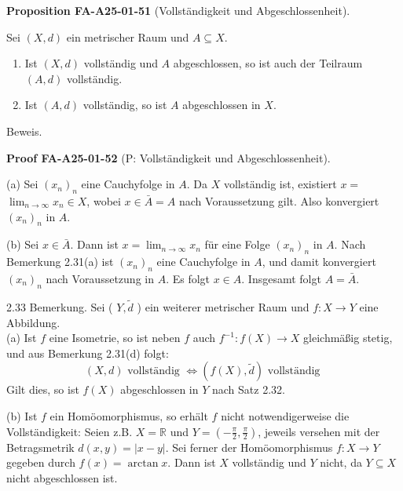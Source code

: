 \documentclass[10pt, letterpaper]{article}
\newcommand{\CustomHeading}[3]{%
  \par\medskip\noindent%
  \textbf{#1 #2} \textnormal{(#3)}.\enskip%
}
\newenvironment{PROP}[2]{\begin{unitbox}\CustomHeading{Proposition}{#1}{#2}}{\end{unitbox}}
\newenvironment{PROOF}[2]{\begin{unitbox}\CustomHeading{Proof}{#1}{#2}}{\end{unitbox}}
\begin{document}
\begin{PROP}{FA-A25-01-51}{Vollständigkeit und Abgeschlossenheit}
Sei $(X,d)$ ein metrischer Raum und $A\subseteq X$.
\begin{enumerate}
\item[(a)] Ist $(X,d)$ vollständig und $A$ abgeschlossen, so ist auch der Teilraum $(A,d)$ vollständig.

\item[(b)] Ist $(A,d)$ vollständig, so ist $A$ abgeschlossen in $X$.
\end{enumerate}
\end{PROP}



Beweis. 

\begin{PROOF}{FA-A25-01-52}{P: Vollständigkeit und Abgeschlossenheit}
(a) Sei $\left(x_{n}\right)_{n}$ eine Cauchyfolge in $A$. Da $X$ vollständig ist, existiert $x=$ $\lim _{n \rightarrow \infty} x_{n} \in X$, wobei $x \in \bar{A}=A$ nach Voraussetzung gilt. Also konvergiert $\left(x_{n}\right)_{n}$ in $A$.

(b) Sei $x \in \bar{A}$. Dann ist $x=\lim _{n \rightarrow \infty} x_{n}$ für eine Folge $\left(x_{n}\right)_{n}$ in $A$. Nach Bemerkung 2.31(a) ist $\left(x_{n}\right)_{n}$ eine Cauchyfolge in $A$, und damit konvergiert $\left(x_{n}\right)_{n}$ nach Voraussetzung in $A$. Es folgt $x \in A$. Insgesamt folgt $A=\bar{A}$.
\end{PROOF}


2.33 Bemerkung. Sei ( $Y, \tilde{d}$ ) ein weiterer metrischer Raum und $f: X \rightarrow Y$ eine Abbildung.\\
(a) Ist $f$ eine Isometrie, so ist neben $f$ auch $f^{-1}: f(X) \rightarrow X$ gleichmäßig stetig, und aus Bemerkung 2.31(d) folgt:
$$
(X, d) \text { vollständig } \Longleftrightarrow(f(X), \tilde{d}) \text { vollständig }
$$
Gilt dies, so ist $f(X)$ abgeschlossen in $Y$ nach Satz 2.32.

(b) Ist $f$ ein Homöomorphismus, so erhält $f$ nicht notwendigerweise die Vollständigkeit: Seien z.B. $X=\mathbb{R}$ und $Y=\left(-\frac{\pi}{2}, \frac{\pi}{2}\right)$, jeweils versehen mit der Betragsmetrik $d(x, y)=|x-y|$. Sei ferner der Homöomorphismus $f: X \rightarrow Y$ gegeben durch $f(x)=\arctan x$. Dann ist $X$ vollständig und $Y$ nicht, da $Y \subseteq X$ nicht abgeschlossen ist.
\end{document}
